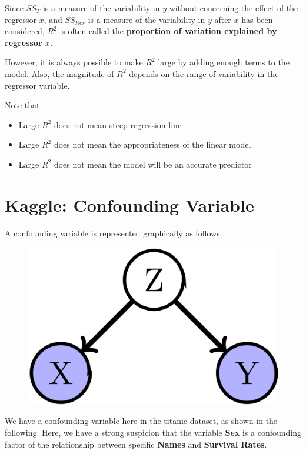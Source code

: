 \documentclass[12pt]{article}
\begin{document}
Since $SS_T$ is a measure of the variability in $y$ without concerning the effect of the regressor $x$, and $SS_{Res}$ is a measure of the variability in $y$ after $x$ has been considered, $R^2$ is often called the \textbf{proportion of variation explained by regressor $x$.}

However, it is always possible to make $R^2$ large by adding enough terms to the model. Also, the magnitude of $R^2$ depends on the range of variability in the regressor variable.

Note that 

\begin{itemize}
	\item Large $R^2$ does not mean steep regression line
	\item Large $R^2$ does not mean the appropriateness of the linear model
	\item Large $R^2$ does not mean the model will be an accurate predictor
\end{itemize}


\pagebreak

\section*{Kaggle: Confounding Variable}

A confounding variable is represented graphically as follows.

\begin{figure}[h!]
	\centering
	\includegraphics[scale=0.1]{Confounding.png}
\end{figure}

We have a confounding variable here in the titanic dataset, as shown in the following. Here, we have a strong suspicion that the variable \textbf{Sex} is a confounding factor of the relationship between specific \textbf{Names} and \textbf{Survival Rates}.
\end{document}
